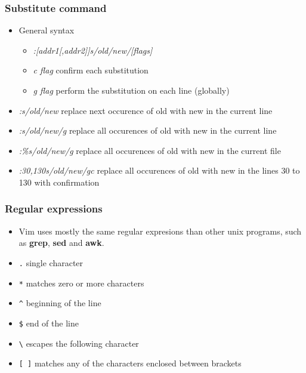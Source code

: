 \documentclass{beamer}
\begin{document}
\begin{frame}
\frametitle{Substitute command}

\begin{itemize}
\item General syntax
\begin{itemize}
\item \textit{:[addr1[,addr2]]s/old/new/[flags]}
\item \textit{c flag} confirm each substitution
\item \textit{g flag} perform the substitution on each line (globally)
\end{itemize}
\item \textit{:s/old/new} replace next occurence of old with new in the current line
\item \textit{:s/old/new/g} replace all occurences of old with new in the current line
\item \textit{:\%s/old/new/g} replace all occurences of old with new in the current file
\item \textit{:30,130s/old/new/gc} replace all occurences of old with new in the lines 30 to 130 with confirmation

\end{itemize}

\end{frame}



\begin{frame}
\frametitle{Regular expressions}

\begin{itemize}
\item Vim uses mostly the same regular expresions than other unix programs, such as \textbf{grep}, \textbf{sed} and \textbf{awk}.
\item \texttt{.} single character
\item \texttt{*} matches zero or more characters
\item \texttt{\^} beginning of the line
\item \texttt{\$} end of the line
\item \texttt{\textbackslash} escapes the following character
\item \texttt{[ ]} matches any of the characters enclosed between brackets
\end{itemize}

\end{frame}


\end{document}
